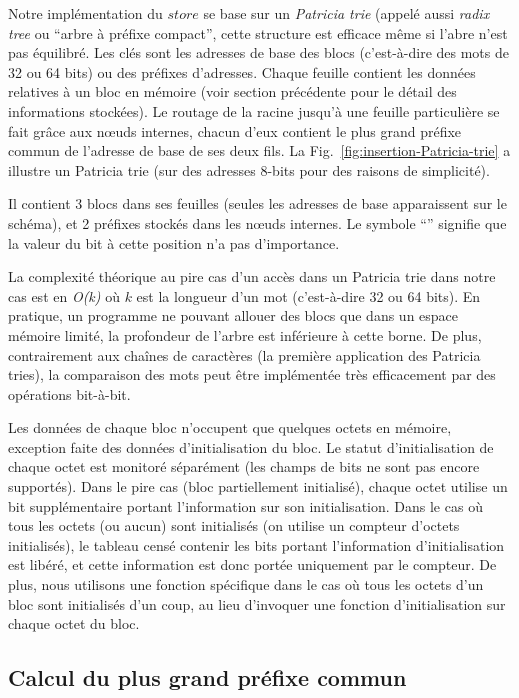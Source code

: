 \documentclass[french]{spimufcphdthesis}
\begin{document}
Notre implémentation du $store$ se base sur un {\em Patricia trie}
\cite{Patricia-tries} (appelé aussi {\em radix tree} ou ``arbre à préfixe
compact'', cette structure est efficace même si l'abre n'est pas équilibré.
Les clés sont les adresses de base des blocs (c'est-à-dire des mots de 32 ou 64
bits) ou des préfixes d'adresses. Chaque feuille contient les données relatives
à un bloc en mémoire (voir section précédente pour le détail des informations
stockées). Le routage de la racine jusqu'à une feuille particulière se fait
grâce aux n\oe{}uds internes, chacun d'eux contient le plus grand préfixe commun
de l'adresse de base de ses deux fils. La Fig.~\ref{fig:insertion-Patricia-trie}
a illustre un Patricia trie (sur des adresses 8-bits pour des raisons de
simplicité).

Il contient 3 blocs dans ses feuilles (seules les adresses de base apparaissent
sur le schéma), et 2 préfixes stockés dans les n\oe{}uds internes. Le symbole
``{\tt *}'' signifie que la valeur du bit à cette position n'a pas d'importance.

La complexité théorique au pire cas d'un accès dans un Patricia trie dans notre
cas est en {\em O(k)} où $k$ est la longueur d'un mot (c'est-à-dire 32 ou 64
bits). En pratique, un programme ne pouvant allouer des blocs que dans un
espace mémoire limité, la profondeur de l'arbre est inférieure à cette borne.
De plus, contrairement aux chaînes de caractères (la première application des
Patricia tries), la comparaison des mots peut être implémentée très
efficacement par des opérations bit-à-bit.

Les données de chaque bloc n'occupent que quelques octets en mémoire, exception
faite des données d'initialisation du bloc. Le statut d'initialisation de chaque
octet est monitoré séparément
(les champs de bits ne sont pas encore supportés). Dans le pire cas (bloc
partiellement initialisé), chaque octet utilise un bit supplémentaire portant
l'information sur son initialisation. Dans le cas où tous les octets (ou aucun)
sont initialisés (on utilise un compteur d'octets initialisés), le tableau
censé contenir les bits portant l'information d'initialisation est libéré, et
cette information est donc portée uniquement par le compteur. De plus, nous
utilisons une fonction spécifique dans le cas où tous les octets d'un bloc sont
initialisés d'un coup, au lieu d'invoquer une fonction d'initialisation sur
chaque octet du bloc.


\subsection{Calcul du plus grand préfixe commun}
\end{document}
